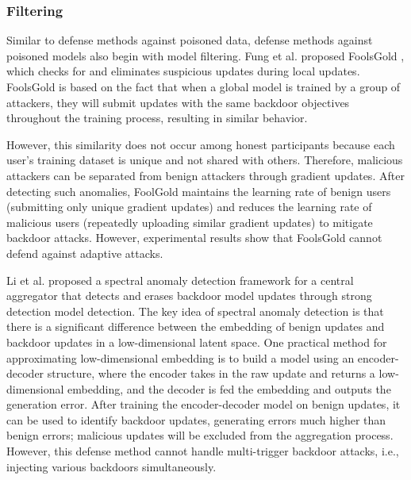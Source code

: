\documentclass[conference]{IEEEtran}
\begin{document}
\subsubsection{Filtering}
Similar to defense methods against poisoned data, defense methods against poisoned models also begin with model filtering.
Fung et al. proposed FoolsGold \cite{b78}, which checks for and eliminates suspicious updates during local updates.
FoolsGold is based on the fact that when a global model is trained by a group of attackers, they will submit updates with
the same backdoor objectives throughout the training process, resulting in similar behavior.

However, this similarity does not occur among honest participants because each user's training dataset is unique and not shared with others.
Therefore, malicious attackers can be separated from benign attackers through gradient updates. After detecting such anomalies,
FoolGold maintains the learning rate of benign users (submitting only unique gradient updates) and reduces the learning rate of malicious users
(repeatedly uploading similar gradient updates) to mitigate backdoor attacks. However, experimental results show that
FoolsGold cannot defend against adaptive attacks.

Li et al. \cite{b79} proposed a spectral anomaly detection framework for a
central aggregator that detects and erases backdoor model updates through strong detection model detection.
The key idea of spectral anomaly detection is that there is a significant difference between the embedding
of benign updates and backdoor updates in a low-dimensional latent space. One practical method for approximating
low-dimensional embedding is to build a model using an encoder-decoder structure, where the encoder takes
in the raw update and returns a low-dimensional embedding, and the decoder is fed the embedding and outputs
the generation error.  After training the encoder-decoder model on benign updates, it can be used to identify
backdoor updates, generating errors much higher than benign errors; malicious updates will be excluded from
the aggregation process. However, this defense method cannot handle multi-trigger backdoor attacks, i.e.,
injecting various backdoors simultaneously.
\end{document}
